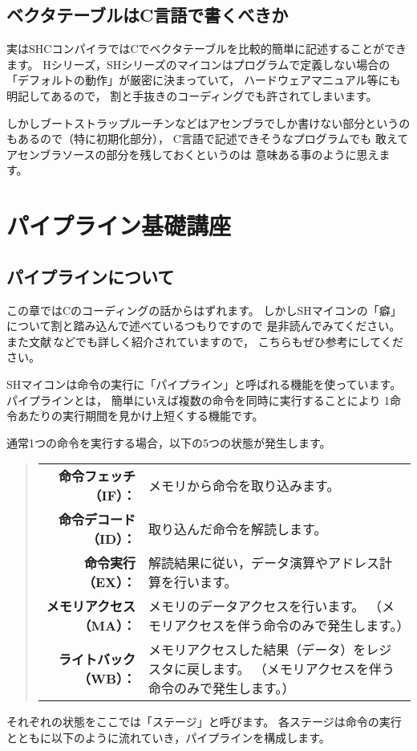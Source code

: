 \documentclass[a4j,10pt,fleqn]{jsarticle}
\begin{document}
\subsection{ベクタテーブルはC言語で書くべきか}

実はSHCコンパイラではCでベクタテーブルを比較的簡単に記述することができます。
Hシリーズ，SHシリーズのマイコンはプログラムで定義しない場合の
「デフォルトの動作」が厳密に決まっていて，
ハードウェアマニュアル等にも明記してあるので，
割と手抜きのコーディングでも許されてしまいます。

しかしブートストラップルーチンなどはアセンブラでしか書けない部分というのもあるので（特に初期化部分），
C言語で記述できそうなプログラムでも
敢えてアセンブラソースの部分を残しておくというのは
意味ある事のように思えます。


\section{パイプライン基礎講座}

\subsection{パイプラインについて}

この章ではCのコーディングの話からはずれます。
しかしSHマイコンの「癖」について割と踏み込んで述べているつもりですので
是非読んでみてください。
また文献\cite{SH1SH2:MANUAL:Program}\,などでも詳しく紹介されていますので，
こちらもぜひ参考にしてください。

SHマイコンは命令の実行に「パイプライン」と呼ばれる機能を使っています。
パイプラインとは，
簡単にいえば複数の命令を同時に実行することにより
1命令あたりの実行期間を見かけ上短くする機能です。

通常1つの命令を実行する場合，以下の5つの状態が発生します。
\begin{quote}\begin{tabular}{rp{}}
\textbf{命令フェッチ（IF）：}   & メモリから命令を取り込みます。 \\
\textbf{命令デコード（ID）：}   & 取り込んだ命令を解読します。 \\
\textbf{命令実行（EX）：}       & 解読結果に従い，データ演算やアドレス計算を行います。 \\
\textbf{メモリアクセス（MA）：} & メモリのデータアクセスを行います。
                                    （メモリアクセスを伴う命令のみで発生します。） \\
\textbf{ライトバック（WB）：}   & メモリアクセスした結果（データ）をレジスタに戻します。
                                    （メモリアクセスを伴う命令のみで発生します。） \\
\end{tabular}\end{quote}
それぞれの状態をここでは「ステージ」と呼びます。
各ステージは命令の実行とともに以下のように流れていき，パイプラインを構成します。
\end{document}
